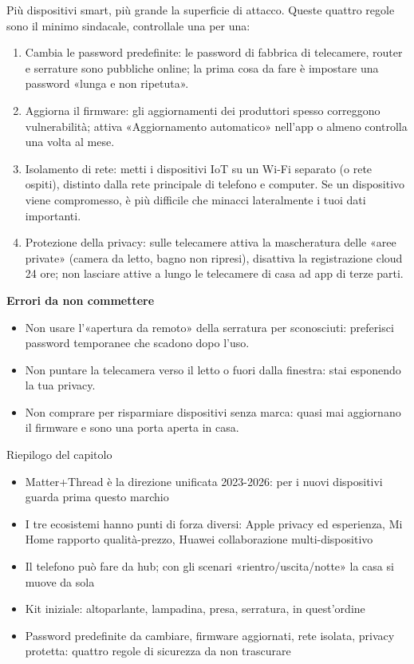 
Più dispositivi smart, più grande la superficie di attacco. Queste quattro regole sono il minimo sindacale, controllale una per una:

\begin{enumerate}
  \item Cambia le password predefinite: le password di fabbrica di telecamere, router e serrature sono pubbliche online; la prima cosa da fare è impostare una password «lunga e non ripetuta».
  \item Aggiorna il firmware: gli aggiornamenti dei produttori spesso correggono vulnerabilità; attiva «Aggiornamento automatico» nell'app o almeno controlla una volta al mese.
  \item Isolamento di rete: metti i dispositivi IoT su un Wi-Fi separato (o rete ospiti), distinto dalla rete principale di telefono e computer. Se un dispositivo viene compromesso, è più difficile che minacci lateralmente i tuoi dati importanti.
  \item Protezione della privacy: sulle telecamere attiva la mascheratura delle «aree private» (camera da letto, bagno non ripresi), disattiva la registrazione cloud 24 ore; non lasciare attive a lungo le telecamere di casa ad app di terze parti.
\end{enumerate}

\textbf{Errori da non commettere}\par

\begin{itemize}
  \item Non usare l'«apertura da remoto» della serratura per sconosciuti: preferisci password temporanee che scadono dopo l'uso.
  \item Non puntare la telecamera verso il letto o fuori dalla finestra: stai esponendo la tua privacy.
  \item Non comprare per risparmiare dispositivi senza marca: quasi mai aggiornano il firmware e sono una porta aperta in casa.
\end{itemize}

\begin{tcbsummary}{Riepilogo del capitolo}
\begin{itemize}
  \item Matter+Thread è la direzione unificata 2023-2026: per i nuovi dispositivi guarda prima questo marchio
  \item I tre ecosistemi hanno punti di forza diversi: Apple privacy ed esperienza, Mi Home rapporto qualità-prezzo, Huawei collaborazione multi-dispositivo
  \item Il telefono può fare da hub; con gli scenari «rientro/uscita/notte» la casa si muove da sola
  \item Kit iniziale: altoparlante, lampadina, presa, serratura, in quest'ordine
  \item Password predefinite da cambiare, firmware aggiornati, rete isolata, privacy protetta: quattro regole di sicurezza da non trascurare
\end{itemize}

\end{tcbsummary}
